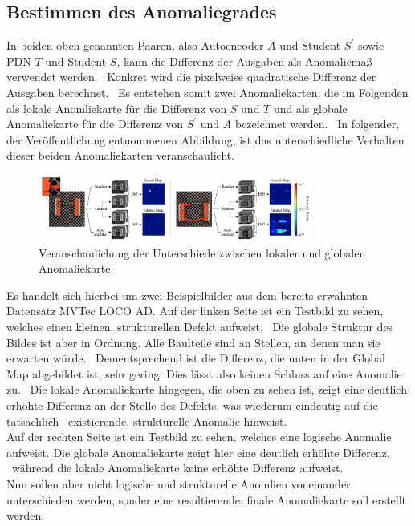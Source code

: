 \subsection{Bestimmen des Anomaliegrades}\label{subsec:efficientadbestimmenanomaliegrades}
In beiden oben genannten Paaren, also Autoencoder $A$ und Student $S^{\prime}$ sowie PDN $T$ und Student $S$, kann die Differenz der Ausgaben als Anomaliemaß verwendet werden. \
Konkret wird die pixelweise quadratische Differenz der Ausgaben berechnet. \
Es entstehen somit zwei Anomaliekarten, die im Folgenden als lokale Anomliekarte für die Differenz von $S$ und $T$ und als globale Anomaliekarte für die Differenz von $S^{\prime}$ und $A$ bezeichnet werden. \
In folgender, der Veröffentlichung entnommenen Abbildung, ist das unterschiedliche Verhalten dieser beiden Anomaliekarten veranschaulicht. \\
\begin{figure}
    \centering
    \includegraphics[width=0.8\textwidth]{bilder/localglobal.png}
    \caption{Veranschaulichung der Unterschiede zwischen lokaler und globaler Anomaliekarte. \cite{efficientad}}
    \label{fig:localglobal}
\end{figure}
Es handelt sich hierbei um zwei Beispielbilder aus dem bereits erwähnten Datensatz MVTec LOCO AD. Auf der linken Seite ist ein Testbild zu sehen, welches einen kleinen, strukturellen Defekt aufweist. \
Die globale Struktur des Bildes ist aber in Ordnung. Alle Baulteile sind an Stellen, an denen man sie erwarten würde. \
Dementsprechend ist die Differenz, die unten in der \glqq Global Map\grqq{} abgebildet ist, sehr gering. Dies lässt also keinen Schluss auf eine Anomalie zu. \
Die lokale Anomaliekarte hingegen, die oben zu sehen ist, zeigt eine deutlich erhöhte Differenz an der Stelle des Defekts, was wiederum eindeutig auf die tatsächlich \
existierende, strukturelle Anomalie hinweist. \\
Auf der rechten Seite ist ein Testbild zu sehen, welches eine logische Anomalie aufweist. Die globale Anomaliekarte zeigt hier eine deutlich erhöhte Differenz, \
während die lokale Anomaliekarte keine erhöhte Differenz aufweist. \\
Nun sollen aber nicht logische und strukturelle Anomlien voneinander unterschieden werden, sonder eine resultierende, finale Anomaliekarte soll erstellt werden. \
